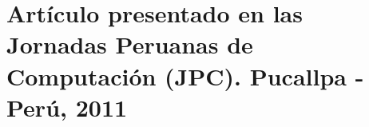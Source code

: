\chapter{Artículo presentado en las Jornadas Peruanas de Computación (JPC). Pucallpa - Perú, 2011}
\label{ape:apendiceD}


%